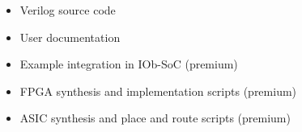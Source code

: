\begin{itemize}
\item Verilog source code
\item User documentation
\item Example integration in IOb-SoC (premium)
\item FPGA synthesis and implementation scripts (premium)
\item ASIC synthesis and place and route scripts (premium)
\end{itemize}
